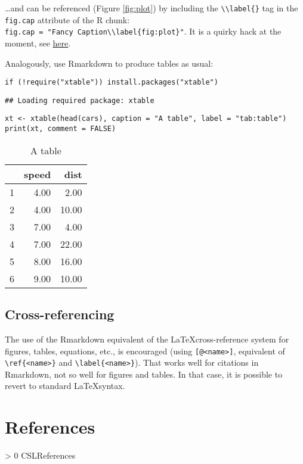 \documentclass[AMA,STIX1COL,]{WileyNJD-v2}
\newlength{\cslhangindent}
\newenvironment{CSLReferences}[3] %
 {%
  \setlength{\parindent}{0pt}
  \ifodd #1 \everypar{\setlength{\hangindent}{\cslhangindent}}\ignorespaces\fi
  \ifnum #2 > 0
  \setlength{\parskip}{#2\baselineskip}
  \fi
 }%
 {}
\begin{document}
\ldots and can be referenced (Figure \ref{fig:plot}) by including the
\texttt{\textbackslash{}\textbackslash{}label\{\}} tag in the
\texttt{fig.cap} attribute of the R chunk:
\texttt{fig.cap\ =\ "Fancy\ Caption\textbackslash{}\textbackslash{}label\{fig:plot\}"}.
It is a quirky hack at the moment, see
\href{https://github.com/yihui/knitr/issues/323}{here}.

Analogously, use Rmarkdown to produce tables as usual:

\begin{verbatim}
if (!require("xtable")) install.packages("xtable")
\end{verbatim}

\begin{verbatim}
## Loading required package: xtable
\end{verbatim}

\begin{verbatim}
xt <- xtable(head(cars), caption = "A table", label = "tab:table")
print(xt, comment = FALSE)
\end{verbatim}

\begin{table}[ht]
\centering
\begin{tabular}{rrr}
  \hline
 & speed & dist \\ 
  \hline
1 & 4.00 & 2.00 \\ 
  2 & 4.00 & 10.00 \\ 
  3 & 7.00 & 4.00 \\ 
  4 & 7.00 & 22.00 \\ 
  5 & 8.00 & 16.00 \\ 
  6 & 9.00 & 10.00 \\ 
   \hline
\end{tabular}
\caption{A table} 
\label{tab:table}
\end{table}

\hypertarget{cross-referencing}{%
\subsection{Cross-referencing}\label{cross-referencing}}

The use of the Rmarkdown equivalent of the \LaTeX cross-reference system
for figures, tables, equations, etc., is encouraged (using
\texttt{{[}@\textless{}name\textgreater{}{]}}, equivalent of
\texttt{\textbackslash{}ref\{\textless{}name\textgreater{}\}} and
\texttt{\textbackslash{}label\{\textless{}name\textgreater{}\}}). That
works well for citations in Rmarkdown, not so well for figures and
tables. In that case, it is possible to revert to standard
\LaTeX syntax.

\hypertarget{references}{%
\section{References}\label{references}}

\hypertarget{refs}{}
\begin{CSLReferences}{0}{0}
\end{CSLReferences}


\end{document}
